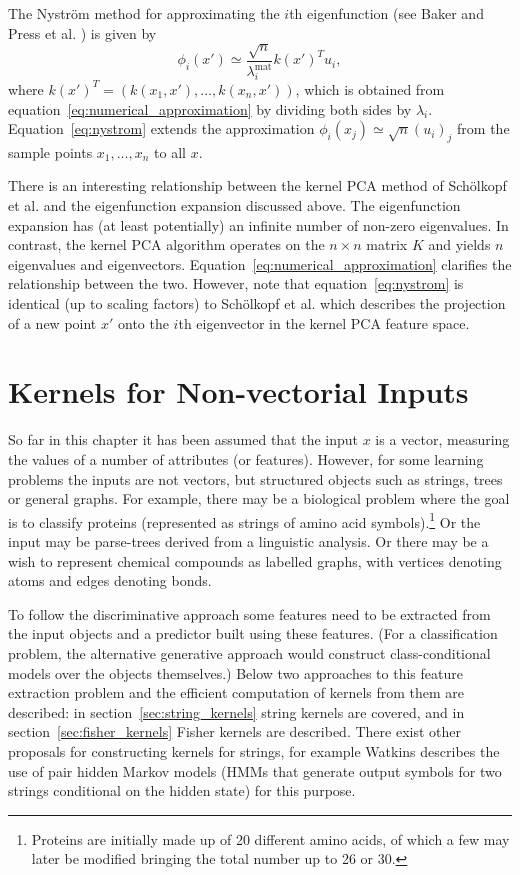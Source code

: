 \documentclass[11pt]{book}
\begin{document}
The Nyström method for approximating the $i$th eigenfunction (see Baker \cite{baker1977} and Press et al. \cite{press1992}) is given by
\begin{equation}
\label{eq:nystrom}
\phi_i(x') \simeq \frac{\sqrt{n}}{\lambda_i^{\text{mat}}} k(x')^T u_i,
\end{equation}
where $k(x')^T = (k(x_1, x'), \ldots, k(x_n, x'))$, which is obtained from equation~\eqref{eq:numerical_approximation} by dividing both sides by $\lambda_i$. Equation~\eqref{eq:nystrom} extends the approximation $\phi_i(x_j) \simeq \sqrt{n}(u_i)_j$ from the sample points $x_1, \ldots, x_n$ to all $x$.

There is an interesting relationship between the kernel PCA method of Schölkopf et al. \cite{scholkopf1998} and the eigenfunction expansion discussed above. The eigenfunction expansion has (at least potentially) an infinite number of non-zero eigenvalues. In contrast, the kernel PCA algorithm operates on the $n \times n$ matrix $K$ and yields $n$ eigenvalues and eigenvectors. Equation~\eqref{eq:numerical_approximation} clarifies the relationship between the two. However, note that equation~\eqref{eq:nystrom} is identical (up to scaling factors) to Schölkopf et al. \cite{scholkopf1998} which describes the projection of a new point $x'$ onto the $i$th eigenvector in the kernel PCA feature space.

\section{Kernels for Non-vectorial Inputs}
\label{sec:nonvectorial}

So far in this chapter it has been assumed that the input $x$ is a vector, measuring the values of a number of attributes (or features). However, for some learning problems the inputs are not vectors, but structured objects such as strings, trees or general graphs. For example, there may be a biological problem where the goal is to classify proteins (represented as strings of amino acid symbols).\footnote{Proteins are initially made up of 20 different amino acids, of which a few may later be modified bringing the total number up to 26 or 30.} Or the input may be parse-trees derived from a linguistic analysis. Or there may be a wish to represent chemical compounds as labelled graphs, with vertices denoting atoms and edges denoting bonds.

To follow the discriminative approach some features need to be extracted from the input objects and a predictor built using these features. (For a classification problem, the alternative generative approach would construct class-conditional models over the objects themselves.) Below two approaches to this feature extraction problem and the efficient computation of kernels from them are described: in section~\ref{sec:string_kernels} string kernels are covered, and in section~\ref{sec:fisher_kernels} Fisher kernels are described. There exist other proposals for constructing kernels for strings, for example Watkins \cite{watkins2000} describes the use of pair hidden Markov models (HMMs that generate output symbols for two strings conditional on the hidden state) for this purpose.
\end{document}
